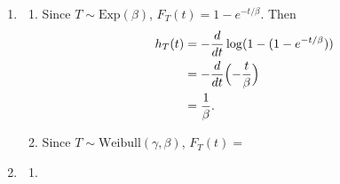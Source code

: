 \documentclass{article}
\begin{document}
\begin{enumerate}
    \item \begin{enumerate}
        \item Since $T \sim \text{Exp}(\beta)$, $F_{T}(t) = 1 - e^{-t / \beta}$. Then 
        \begin{align*}
            h_{T}(t)
            &= -\frac{d}{dt} \log(1 - (1 - e^{-t / \beta})) \\
            &= -\frac{d}{dt} \Bigl( -\frac{t}{\beta} \Bigr) \\
            &= \frac{1}{\beta}.
        \end{align*}

        \item Since $T \sim \text{Weibull}(\gamma, \beta)$, $F_{T}(t) = $
    \end{enumerate}

    \item \begin{enumerate}
        \item 
    \end{enumerate}
\end{enumerate}
\end{document}
